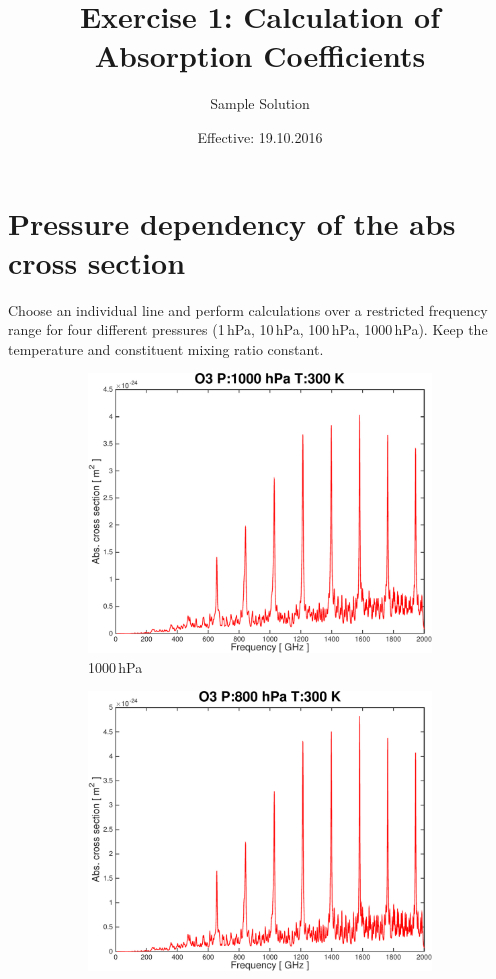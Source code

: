 \documentclass[paper=a4, fontsize=11pt]{scrartcl} %
\title{Exercise 1: Calculation of Absorption Coefficients}
\author{Sample Solution}
\date{Effective: 19.10.2016}
\begin{document}
\maketitle

\section{Pressure dependency of the abs cross section}
Choose an individual line and perform calculations over a restricted frequency
range for four different pressures (1\,hPa, 10\,hPa, 100\,hPa, 1000\,hPa).
Keep the temperature and constituent mixing ratio constant.

\begin{figure}[ht]
    \centering
    \begin{subfigure}[t]{0.45\textwidth}
        \includegraphics[width=\textwidth]{plots/plot_xsec_O3_1000hPa_300K.pdf}
        \caption{1000\,hPa}
    \end{subfigure}
    \begin{subfigure}[t]{0.45\textwidth}
        \includegraphics[width=\textwidth]{plots/plot_xsec_O3_800hPa_300K.pdf}

\end{subfigure}
\end{figure}
\end{document}
